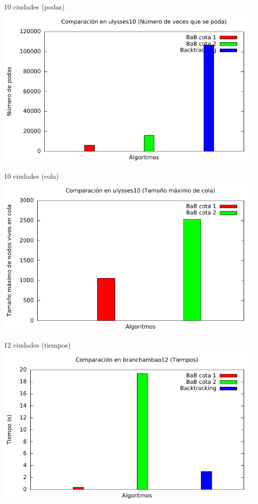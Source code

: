 \begin{frame}{10 ciudades (podas)}
\includegraphics[width=\textwidth]{img/barras_ulysses10_poda}
\end{frame}

\begin{frame}{10 ciudades (cola)}
\includegraphics[width=\textwidth]{img/barras_ulysses10_cola}
\end{frame}

\begin{frame}{12 ciudades (tiempos)}
\includegraphics[width=\textwidth]{img/barras_branchambao12_t}
\end{frame}

